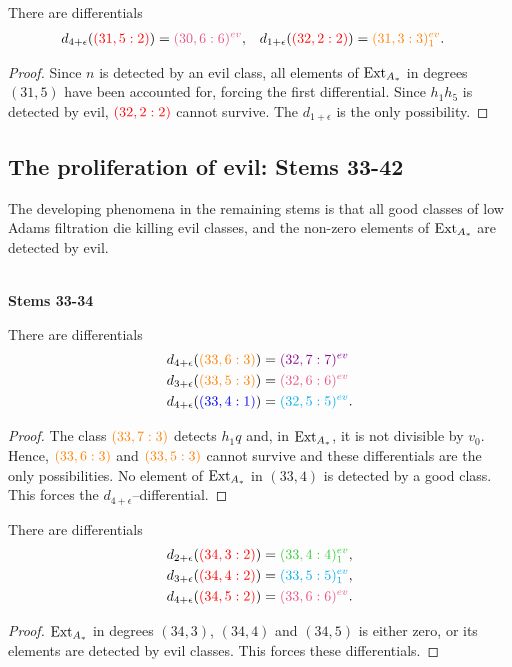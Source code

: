 \begin{prop}
There are differentials
\begin{align*}
d_{4+\epsilon}({\color{red}(31,5:2)}) &= {\color{lavenderrose}(30,6:6)^{ev}}, & d_{1+\epsilon}({\color{red}(32,2 : 2)})&={\color{orange}(31,3 : 3)^{ev}_1}.\end{align*}
\end{prop}
\begin{proof}
Since $n$ is detected by an evil class, all elements of $\operatorname{Ext}_{A_*}$ in degrees $(31,5)$ have been accounted for, forcing the first differential. Since $h_1h_5$ is detected by evil, ${\color{red}(32,2 : 2)}$ cannot survive. The $d_{1+\epsilon}$ is the only possibility.
\end{proof}


\subsection*{The proliferation of evil: Stems 33-42}
The developing phenomena in the remaining stems is that all good classes of low Adams filtration die killing evil classes, and the non-zero elements of $\operatorname{Ext}_{A_*}$ are detected by evil.

\ \\
\noindent
{\bf Stems 33-34}


\begin{prop}
There are differentials
\begin{align*}d_{4+\epsilon}({\color{orange}(33,6 : 3)})&={\color{darkmagenta}(32, 7 : 7)^{ev}}  \\
d_{3+\epsilon}({\color{orange}(33,5 : 3)})&={\color{lavenderrose}(32, 6 : 6)^{ev}} \\
 d_{4+\epsilon}({\color{blue}(33,4 : 1)})&={\color{cyan}(32, 5 :5)^{ev}}.
\end{align*}
\end{prop}

\begin{proof}The class
${\color{orange}(33,7 : 3)}$ detects $h_1q$ and, in $\operatorname{Ext}_{A_*}$, it is not divisible by $v_0$. Hence, ${\color{orange}(33,6 : 3)}$ and ${\color{orange}(33,5 : 3)}$ cannot survive and these differentials are the only possibilities.
No element of $\operatorname{Ext}_{A_*}$ in $(33,4)$ is detected by a good class. This forces the $d_{4+\epsilon}$--differential.
\end{proof}


\begin{prop}
There are differentials
\begin{align*}
d_{2+\epsilon}({\color{red}(34,3 : 2)})&={\color{limegreen}(33, 4 : 4)_1^{ev} },\\
d_{3+\epsilon}({\color{red}(34,4 : 2)})&={\color{cyan}(33, 5 : 5)_1^{ev} }, \\
d_{4+\epsilon}({\color{red}(34,5 : 2)})&={\color{lavenderrose}(33, 6 : 6)^{ev} }.
\end{align*}
\end{prop}
\begin{proof}
$\operatorname{Ext}_{A_*}$ in degrees $(34,3)$, $(34,4)$ and $(34,5)$ is either zero, or its elements are detected by evil classes. This forces these differentials.
\end{proof}


